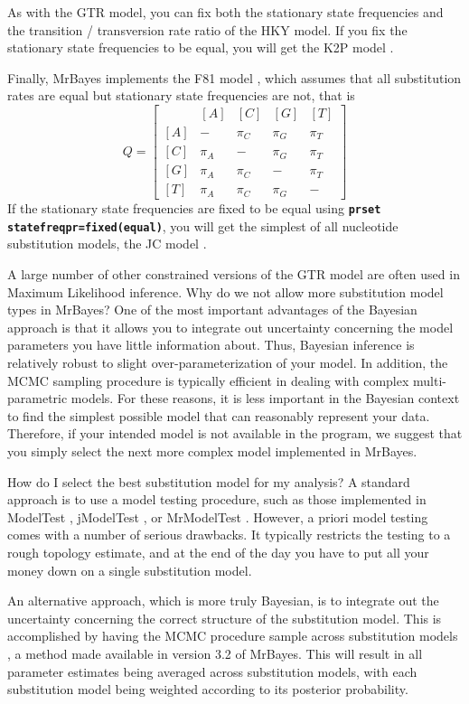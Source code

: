 \documentclass[12pt]{book}
\newcommand{\ttt}[1]{\texttt{#1}}
\newcommand{\tb}[1]{\ttt{\textbf{#1}}}
\begin{document}
As with the GTR model, you can fix both the stationary state frequencies and the transition /
transversion rate ratio of the HKY model. If you fix the stationary state frequencies to be equal,
you will get the K2P model \citep{kimura80}.

Finally, MrBayes implements the F81 model \citep{felsenstein81}, which assumes that all
substitution rates are equal but stationary state frequencies are not, that is
\[
Q=\begin{bmatrix}
    & [A] & [C] & [G] & [T] \\
 [A]& - & \pi_C & \pi_G & \pi_T\\
 [C]& \pi_A & - & \pi_G &\pi_T \\
 [G]& \pi_A & \pi_C& - & \pi_T\\
 [T]& \pi_A & \pi_C&\pi_G  & -
\end{bmatrix}
\]
If the stationary state frequencies are fixed to be equal using \tb{prset
statefreqpr=fixed(equal)}, you will get the simplest of all nucleotide substitution models, the
JC model \citep{jukes69}.

A large number of other constrained versions of the GTR model are often used in Maximum Likelihood
inference. Why do we not allow more substitution model types in MrBayes?  One of the most important
advantages of the Bayesian approach is that it allows you to integrate out uncertainty concerning
the model parameters you have little information about. Thus, Bayesian inference is relatively
robust to slight over-parameterization of your model. In addition, the MCMC sampling procedure is
typically efficient in dealing with complex multi-parametric models. For these reasons, it is less
important in the Bayesian context to find the simplest possible model that can reasonably represent
your data. Therefore, if your intended model is not available in the program, we suggest that you
simply select the next more complex model implemented in MrBayes.

How do I select the best substitution model for my analysis? A standard approach is to use a model
testing procedure, such as those implemented in ModelTest \citep{posada98}, jModelTest
\citep{posada08}, or MrModelTest \citep{nylander04b}. However, a priori model testing comes with a
number of serious drawbacks. It typically restricts the testing to a rough topology estimate, and
at the end of the day you have to put all your money down on a single substitution model.

An alternative approach, which is more truly Bayesian, is to integrate out the uncertainty
concerning the correct structure of the substitution model. This is accomplished by having the MCMC
procedure sample across substitution models \citep{huelsenbeck04d}, a method made available in
version 3.2 of MrBayes. This will result in all parameter estimates being averaged across
substitution models, with each substitution model being weighted according to its posterior
probability.
\end{document}
